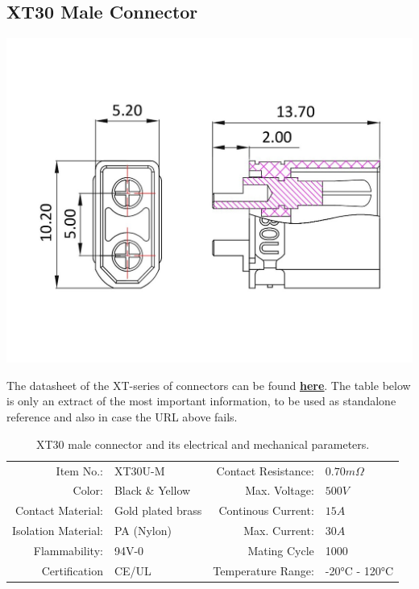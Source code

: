 \clearpage %
    
\subsection{XT30 Male Connector}

\includegraphics[width=\textwidth]{contents/figures/xt30_m.jpg}

The datasheet of the XT-series of connectors can be found \href{https://www.lcsc.com/datasheet/lcsc_datasheet_2304140030_Changzhou-Amass-Elec-XT30U-F_C99101.pdf}{\textbf{\underline{here}}}.
The table below is only an extract of the most important information, to be used as standalone reference and also in case the URL above fails.

\begin{table}[h] %
    \begin{tabular}{rlrl}
         Item No.:&  XT30U-M &  Contact Resistance:& $0.70m \Omega$\\
         Color:&  Black \& Yellow&  Max. Voltage:& $500V$\\
         Contact Material:&  Gold plated brass&  Continous Current:& $15A$\\
         Isolation Material:&  PA (Nylon)&  Max. Current:& $30A$\\
         Flammability:&  94V-0&  Mating Cycle& 1000\\
         Certification&  CE/UL&  Temperature Range:& -20°C - 120°C\\
    \end{tabular}
    \caption{XT30 male connector and its electrical and mechanical parameters.}
    \label{xt30_m_specs}
\end{table}

